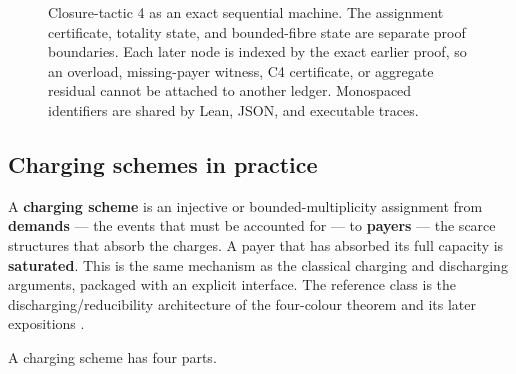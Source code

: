\documentclass[
  11pt,
]{article}
\theoremstyle{definition}
\begin{document}
\begin{figure}[p]
{%
}
\caption[Closure-tactic 4: exact charging machine]{Closure-tactic 4 as an exact sequential machine.  The assignment certificate, totality state, and bounded-fibre state are separate proof boundaries.  Each later node is indexed by the exact earlier proof, so an overload, missing-payer witness, C4 certificate, or aggregate residual cannot be attached to another ledger.  Monospaced identifiers are shared by Lean, JSON, and executable traces.}
\label{fig:ct4-charging-schemes}
\end{figure}
\FloatBarrier


\subsection*{Charging schemes in practice}

A \textbf{charging scheme} is an injective or bounded-multiplicity
assignment from \textbf{demands} --- the events that must be accounted
for --- to \textbf{payers} --- the scarce structures that absorb the
charges. A payer that has absorbed its full capacity is
\textbf{saturated}. This is the same mechanism as the classical charging
and discharging arguments, packaged with an explicit interface. The
reference class is the discharging/reducibility architecture of the
four-colour theorem and its later expositions
\citep{appel-haken-1977-discharging, appel-haken-koch-1977-reducibility, robertson-etal-1997-four-colour, cranston-west-2017-discharging}.

A charging scheme has four parts.
\end{document}
